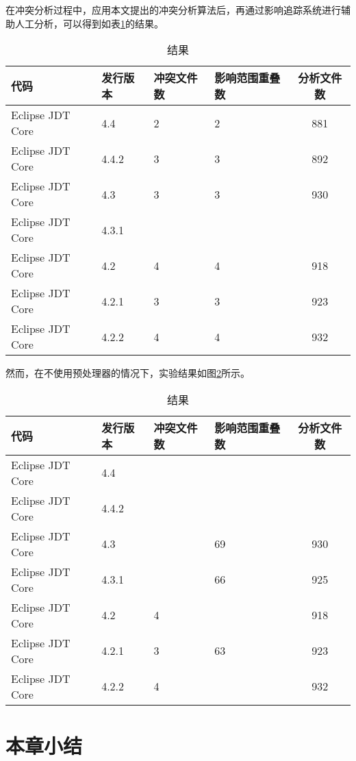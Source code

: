 在冲突分析过程中，应用本文提出的冲突分析算法后，再通过影响追踪系统进行辅助人工分析，可以得到如表\ref {data_compatible}的结果。

\begin{table}[H]
	\caption{结果}
	\label{data_compatible}
	\centering
	\begin{tabular}{llllc}
		\toprule[1.5pt]
		{\heiti 代码} & {\heiti 发行版本} & {\heiti 冲突文件数} & {\heiti 影响范围重叠数} & {\heiti 分析文件数} \\\midrule[1pt]
		Eclipse JDT Core & 4.4 	& 2 & 2 & 881\\
		Eclipse JDT Core & 4.4.2 & 3 & 3 & 892\\
		Eclipse JDT Core & 4.3 	& 3 & 3 & 930\\
		Eclipse JDT Core & 4.3.1 		\\
		Eclipse JDT Core & 4.2 	& 4 & 4 & 918\\
		Eclipse JDT Core & 4.2.1 & 3  &	3 & 923\\
		Eclipse JDT Core & 4.2.2 & 4 & 4 & 932\\
		\bottomrule[1.5pt]
	\end{tabular}
\end{table}

然而，在不使用预处理器的情况下，实验结果如图\ref {data_compatible_2}所示。

\begin{table}[H]
	\caption{结果}
	\label{data_compatible_2}
	\centering
	\begin{tabular}{llllc}
		\toprule[1.5pt]
		{\heiti 代码} & {\heiti 发行版本} & {\heiti 冲突文件数} & {\heiti 影响范围重叠数} & {\heiti 分析文件数} \\\midrule[1pt]
		Eclipse JDT Core & 4.4 			\\
		Eclipse JDT Core & 4.4.2 		\\
		Eclipse JDT Core & 4.3 	& & 69 & 930 \\
		Eclipse JDT Core & 4.3.1 & & 66 & 925\\
		Eclipse JDT Core & 4.2 	& 4 & & 918	\\
		Eclipse JDT Core & 4.2.1 & 3 & 63 & 923\\
		Eclipse JDT Core & 4.2.2 & 4 &  & 932\\
		\bottomrule[1.5pt]
	\end{tabular}
\end{table}


\section{本章小结}